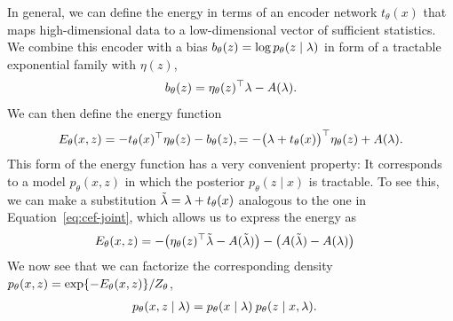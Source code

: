 \documentclass[tablecaption=bottom,wcp]{jmlr} %
\begin{document}
%
In general, we can define the energy in terms of an encoder network $t_\theta(x)$ that maps high-dimensional data to a low-dimensional vector of sufficient statistics. We combine this encoder with a bias $b_\theta(z) = \log p_\theta(z \mid \lambda)$ in form of a tractable exponential family with $\eta(z)$, 
\begin{align}
    b_\theta(z) = \eta_\theta(z)^\top \lambda - A(\lambda).
\end{align}
We can then define the energy function 
\begin{align}
    \begin{split}
    E_\theta(x, z) = -t_\theta(x)^\top \eta_\theta(z) - b_\theta(z),
               = - \big(\lambda + t_\theta(x) \big)^\top \eta_\theta(z) + A(\lambda).
    \end{split}
\end{align}
This form of the energy function has a very convenient property: It corresponds to a model $p_\theta(x,z)$ in which the posterior $p_\theta(z \mid x)$ is tractable. To see this, we can make a substitution $\tilde{\lambda} = \lambda + t_\theta(x)$ analogous to the one in Equation~\ref{eq:cef-joint}, which allows us to express the energy as
\begin{align*}
    \begin{split}
    E_\theta(x, z) &= -\big(\eta_\theta(z)^\top \tilde{\lambda}  - A(\tilde{\lambda}) \big) -\big(A(\tilde{\lambda}) - A(\lambda) \big) 
    \end{split}
\end{align*}
We now see that we can factorize the corresponding density $p_\theta(x,z) = \exp \{ - E_\theta(x,z) \} / Z_\theta$, 
\begin{align}
    p_\theta(x,z \mid \lambda) 
    &= 
    p_\theta(x \mid \lambda) \: p_\theta(z \mid x, \lambda).
\end{align}
\end{document}
